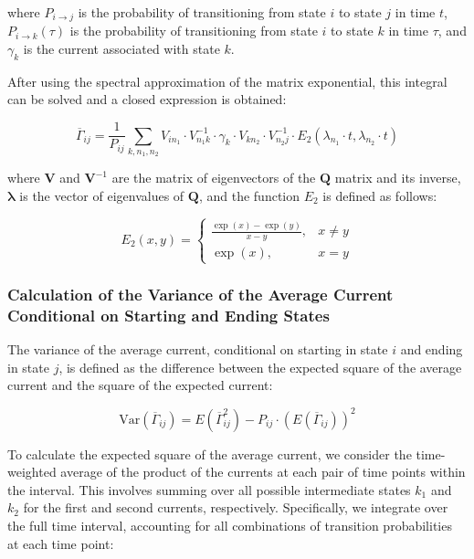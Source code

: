 \documentclass[pdflatex,sn-mathphys-num]{sn-jnl}%
\theoremstyle{thmstyleone}%
\theoremstyle{thmstyletwo}%
\theoremstyle{thmstylethree}%
\begin{document}
where $P_{i \rightarrow j}$ is the probability of transitioning from state $i$ to state $j$ in time $t$, $P_{i \rightarrow k}(\tau)$ is the probability of transitioning from state $i$ to state $k$ in time $\tau$, and $\gamma_k$ is the current associated with state $k$.

After using the spectral approximation of the matrix exponential, this integral can be solved and a closed expression is obtained: 

\begin{equation}
	\overline{\Gamma}_{ij} = \frac{1}{P_{ij}}\sum_{k,n_1,n_2} V_{i n_1} \cdot V^{-1}_{n_1 k} \cdot \gamma_k \cdot V_{k n_2} \cdot V^{-1}_{n_2 j} \cdot E_2(\lambda_{n_1} \cdot t, \lambda_{n_2} \cdot t) 
\end{equation}

where $\mathbf{V}$ and $\mathbf{V}^{-1}$ are the matrix of eigenvectors of the $\mathbf{Q}$ matrix and its inverse, $\boldsymbol{\lambda}$ is the vector of eigenvalues of $\mathbf{Q}$, and the function $E_2$ is defined as follows: 

\begin{equation}
	E_2(x,y)= 
	\begin{cases}
		\frac{\exp(x)-\exp(y)}{x-y},& x\neq y\\
		\exp(x),              & x=y
	\end{cases}
\end{equation}



\subsubsection{Calculation of the Variance of the Average Current Conditional on Starting and Ending States}

The variance of the average current, conditional on starting in state \(i\) and ending in state \(j\), is defined as the difference between the expected square of the average current and the square of the expected current:

\begin{equation}
	\text{Var}(\overline{\Gamma}_{ij}) = E(\overline{\Gamma}_{ij}^2) - P_{ij} \cdot (E(\overline{\Gamma}_{ij}))^2
\end{equation}

To calculate the expected square of the average current, we consider the time-weighted average of the product of the currents at each pair of time points within the interval. This involves summing over all possible intermediate states \(k_1\) and \(k_2\) for the first and second currents, respectively. Specifically, we integrate over the full time interval, accounting for all combinations of transition probabilities at each time point:
\end{document}
